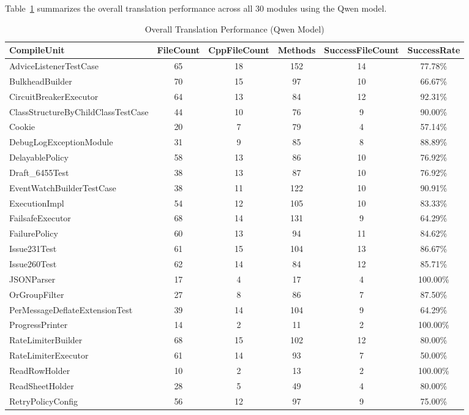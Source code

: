 Table~\ref{tab:overall-results} summarizes the overall translation performance across all 30 modules using the Qwen model.

\begin{table}[h]
\centering
\caption{Overall Translation Performance (Qwen Model)}
\label{tab:overall-results}
\begin{tabular}{lccccc}
\toprule
\textbf{CompileUnit} & \textbf{FileCount} & \textbf{CppFileCount} & \textbf{Methods}& \textbf{SuccessFileCount} & \textbf{SuccessRate} \\
\midrule
AdviceListenerTestCase & 65 & 18 & 152 & 14 & 77.78\% \\
BulkheadBuilder & 70 & 15 & 97 & 10 & 66.67\% \\
CircuitBreakerExecutor & 64 & 13 & 84 & 12 & 92.31\% \\
ClassStructureByChildClassTestCase & 44 & 10 & 76 & 9 & 90.00\% \\
Cookie & 20 & 7 & 79 & 4 & 57.14\% \\
DebugLogExceptionModule & 31 & 9 & 85 & 8 & 88.89\% \\
DelayablePolicy & 58 & 13 & 86 & 10 & 76.92\% \\
Draft_6455Test & 38 & 13 & 87 & 10 & 76.92\% \\
EventWatchBuilderTestCase & 38 & 11 & 122 & 10 & 90.91\% \\
ExecutionImpl & 54 & 12 & 105 & 10 & 83.33\% \\
FailsafeExecutor & 68 & 14 & 131 & 9 & 64.29\% \\
FailurePolicy & 60 & 13 & 94 & 11 & 84.62\% \\
Issue231Test & 61 & 15 & 104 & 13 & 86.67\% \\
Issue260Test & 62 & 14 & 84 & 12 & 85.71\% \\
JSONParser & 17 & 4 & 17 & 4 & 100.00\% \\
OrGroupFilter & 27 & 8 & 86 & 7 & 87.50\% \\
PerMessageDeflateExtensionTest & 39 & 14 & 104 & 9 & 64.29\% \\
ProgressPrinter & 14 & 2 & 11 & 2 & 100.00\% \\
RateLimiterBuilder & 68 & 15 & 102 & 12 & 80.00\% \\
RateLimiterExecutor & 61 & 14 & 93 & 7 & 50.00\% \\
ReadRowHolder & 10 & 2 & 13 & 2 & 100.00\% \\
ReadSheetHolder & 28 & 5 & 49 & 4 & 80.00\% \\
RetryPolicyConfig & 56 & 12 & 97 & 9 & 75.00\% \\

\end{tabular}
\end{table}
